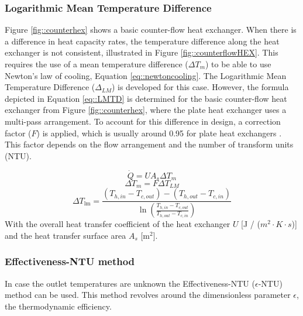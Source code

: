 \subsubsection{Logarithmic Mean Temperature Difference}

Figure \ref{fig::counterhex} shows a basic counter-flow heat exchanger. When there is a difference in heat capacity rates, the temperature difference along the heat exchanger is not consistent, illustrated in Figure \ref{fig::counterflowHEX}. This requires the use of a mean temperature difference ($\Delta T_m$) to be able to use Newton's law of cooling, Equation \ref{eq::newtoncooling}. 
The Logarithmic Mean Temperature Difference ($\Delta_{LM}$) is developed for this case. However, the formula depicted in Equation \ref{eq::LMTD} is determined for the basic counter-flow heat exchanger from Figure \ref{fig::counterhex}, where the plate heat exchanger uses a multi-pass arrangement. To account for this difference in design, a correction factor ($F$) is applied, which is usually around 0.95 for plate heat exchangers \cite{FemkeJanssenLit}. This factor depends on the flow arrangement and the number of transform units (NTU). 

\begin{equation}\label{eq::newtoncooling}
    \dot{Q} =  U A_{s} \Delta T_{m}
\end{equation}
\begin{equation}
    \Delta T_m = F \Delta T_{LM}
\end{equation}
\begin{equation}\label{eq::LMTD}
\Delta T_{\operatorname{lm}}=\frac{(T_{h,in} - T_{c,out}) - (T_{h,out} - T_{c,in})}{\ln \left(\frac{T_{h,in} - T_{c,out}}{T_{h,out} - T_{c,in}}\right)}
\end{equation}
With the overall heat transfer coefficient of the heat exchanger $U$ [J / ($m^2 \cdot K \cdot s$)] and the heat transfer surface area $A_{s}$ [m$^2$].

\subsubsection{Effectiveness-NTU method}
In case the outlet temperatures are unknown the Effectiveness-NTU ($\epsilon$-NTU) method can be used. This method revolves around the dimensionless parameter $\epsilon$, the thermodynamic efficiency. 

